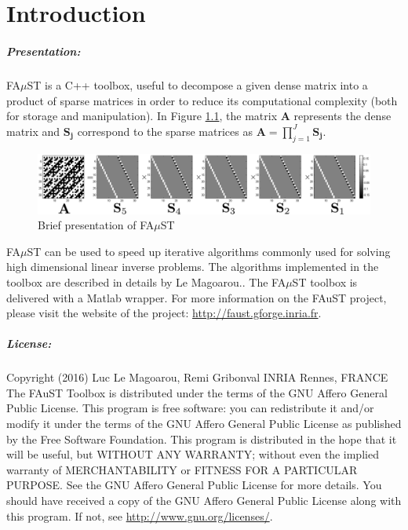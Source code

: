 \chapter{Introduction}\label{sec:intro}

\paragraph{Presentation:}FA$\mu$ST is a C++ toolbox, useful to decompose a given dense matrix into a product of sparse matrices in order to reduce its computational complexity (both for storage and manipulation). In Figure \ref{fig:presentation}, the matrix \textbf{A} represents the dense matrix and $\mathbf{S_j}$ correspond to the sparse matrices as $\mathbf{A}=\prod_{j=1}^J\mathbf{S_j}$.

\begin{figure}[!h] %
\centering
\includegraphics[scale=0.5]{images/hadamard32_bw.pdf}
\caption{Brief presentation of FA$\mu$ST}
\label{fig:presentation}
\end{figure}

FA$\mu$ST can be used to speed up iterative algorithms commonly used for solving high dimensional linear inverse problems. The algorithms implemented in the toolbox are described in details by Le Magoarou.\cite{LeMagoarou2016}.
The FA$\mu$ST toolbox is delivered with a Matlab wrapper. 
For more information on the FAuST project, please visit the website of the project: \url{http://faust.gforge.inria.fr}.



\paragraph{License:}Copyright (2016) Luc Le Magoarou, Remi Gribonval INRIA Rennes, FRANCE \\
The FAuST Toolbox is distributed under the terms of the GNU Affero General Public License. This program is free software: you can redistribute it and/or modify it under the terms of the GNU Affero General Public License as published by the Free Software Foundation. This program is distributed in the hope that it will be useful, but WITHOUT ANY WARRANTY; without even the implied warranty of MERCHANTABILITY or FITNESS FOR A PARTICULAR PURPOSE.  See the GNU Affero General Public License for more details. You should have received a copy of the GNU Affero General Public License along with this program.  If not, see \url{http://www.gnu.org/licenses/}.

